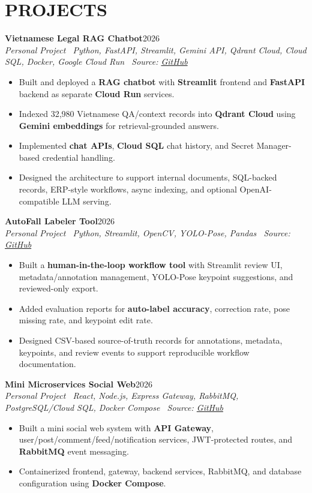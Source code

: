 \documentclass[10pt,a4paper]{article}
\newenvironment{cvitems}{%
    \begin{itemize}[leftmargin=1.1em,itemsep=0pt,topsep=0pt,parsep=0pt]
}{%
    \end{itemize}
}
\newcommand{\entryhead}[2]{%
    \noindent\textbf{#1}\hfill #2\\[-2pt]
}
\newcommand{\entrysub}[1]{%
    \noindent\textit{#1}\\[-1pt]
}
\begin{document}
\section{PROJECTS}
\entryhead{Vietnamese Legal RAG Chatbot}{2026}
\entrysub{Personal Project \textbar\ Python, FastAPI, Streamlit, Gemini API, Qdrant Cloud, Cloud SQL, Docker, Google Cloud Run \textbar\ Source: \href{https://github.com/NguyenKhacBao564/legal_RaG_Chatbot_VietNamese-System}{GitHub}}
\begin{cvitems}
    \item Built and deployed a \textbf{RAG chatbot} with \textbf{Streamlit} frontend and \textbf{FastAPI} backend as separate \textbf{Cloud Run} services.
    \item Indexed 32,980 Vietnamese QA/context records into \textbf{Qdrant Cloud} using \textbf{Gemini embeddings} for retrieval-grounded answers.
    \item Implemented \textbf{chat APIs}, \textbf{Cloud SQL} chat history, and Secret Manager-based credential handling.
    \item Designed the architecture to support internal documents, SQL-backed records, ERP-style workflows, async indexing, and optional OpenAI-compatible LLM serving.
\end{cvitems}

\entryhead{AutoFall Labeler Tool}{2026}
\entrysub{Personal Project \textbar\ Python, Streamlit, OpenCV, YOLO-Pose, Pandas \textbar\ Source: \href{https://github.com/NguyenKhacBao564/autofall-labeler-tool}{GitHub}}
\begin{cvitems}
    \item Built a \textbf{human-in-the-loop workflow tool} with Streamlit review UI, metadata/annotation management, YOLO-Pose keypoint suggestions, and reviewed-only export.
    \item Added evaluation reports for \textbf{auto-label accuracy}, correction rate, pose missing rate, and keypoint edit rate.
    \item Designed CSV-based source-of-truth records for annotations, metadata, keypoints, and review events to support reproducible workflow documentation.
\end{cvitems}

\entryhead{Mini Microservices Social Web}{2026}
\entrysub{Personal Project \textbar\ React, Node.js, Express Gateway, RabbitMQ, PostgreSQL/Cloud SQL, Docker Compose \textbar\ Source: \href{https://github.com/NguyenKhacBao564/Mini_Microservices_Socail_Web}{GitHub}}
\begin{cvitems}
    \item Built a mini social web system with \textbf{API Gateway}, user/post/comment/feed/notification services, JWT-protected routes, and \textbf{RabbitMQ} event messaging.
    \item Containerized frontend, gateway, backend services, RabbitMQ, and database configuration using \textbf{Docker Compose}.
\end{cvitems}
\end{document}
